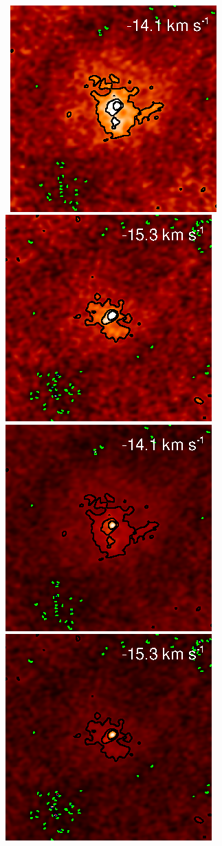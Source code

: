 \documentclass[preprint2]{aastex}
\begin{document}
\begin{figure}[hbt!]
{          }
\\
\mbox{
          \includegraphics[]{test38.ps}
          \includegraphics[]{test39.ps}
          \includegraphics[]{test_38.ps}
          \includegraphics[]{test_39.ps}
}
\end{figure}
\end{document}
